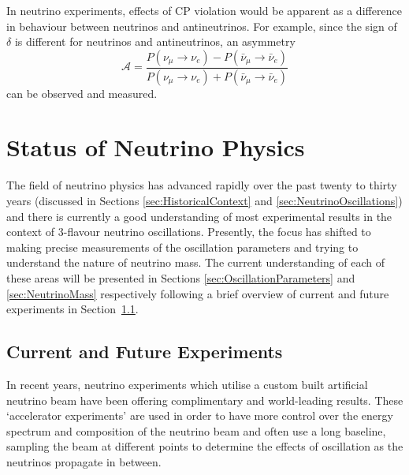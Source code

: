 In neutrino experiments, effects of CP violation would be apparent as a difference in behaviour between neutrinos and antineutrinos.  For example, since the sign of $\delta$ is different for neutrinos and antineutrinos, an asymmetry
\begin{equation}\label{eq:NeutrinoAntineutrinoAsymmetry}
  \mathcal{A} = \frac{P(\nu_{\mu}\rightarrow\nu_e)-P(\bar{\nu}_{\mu}\rightarrow\bar{\nu}_e)}{P(\nu_{\mu}\rightarrow\nu_e)+P(\bar{\nu}_{\mu}\rightarrow\bar{\nu}_e)}
\end{equation}
can be observed and measured.

\section{Status of Neutrino Physics}\label{sec:NeutrinoPhysicsStatus}

The field of neutrino physics has advanced rapidly over the past twenty to thirty years (discussed in Sections \ref{sec:HistoricalContext} and \ref{sec:NeutrinoOscillations}) and there is currently a good understanding of most experimental results in the context of 3-flavour neutrino oscillations.  Presently, the focus has shifted to making precise measurements of the oscillation parameters and trying to understand the nature of neutrino mass.  The current understanding of each of these areas will be presented in Sections \ref{sec:OscillationParameters} and \ref{sec:NeutrinoMass} respectively following a brief overview of current and future experiments in Section~\ref{sec:CurrentExperiments}.

\subsection{Current and Future Experiments}\label{sec:CurrentExperiments}

In recent years, neutrino experiments which utilise a custom built artificial neutrino beam have been offering complimentary and world-leading results.  These `accelerator experiments' are used in order to have more control over the energy spectrum and composition of the neutrino beam and often use a long baseline, sampling the beam at different points to determine the effects of oscillation as the neutrinos propagate in between.

